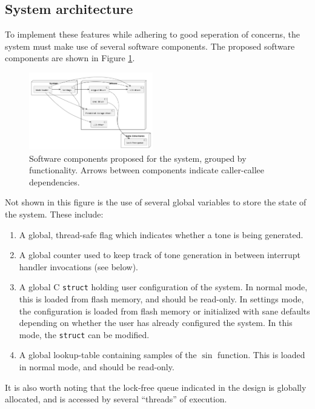 \documentclass[11pt,a4paper,twocolumn]{scrartcl}
\begin{document}
\subsection{System architecture} \label{system-arch}

To implement these features while adhering to good seperation of concerns, the system must make use of several software components.
The proposed software components are shown in Figure \ref{fig:software_components}.

\begin{figure}
   \centering
   \includegraphics[width=0.48\textwidth]{software_components}
   \caption{Software components proposed for the system, grouped by functionality. Arrows between components indicate caller-callee dependencies.}
   \label{fig:software_components}
\end{figure}

Not shown in this figure is the use of several global variables to store the state of the system. These include:

\begin{enumerate}
   \item A global, thread-safe flag which indicates whether a tone is being generated.
   \item A global counter used to keep track of tone generation in between interrupt handler invocations (see below).
   \item A global C \verb!struct! holding user configuration of the system. 
      In normal mode, this is loaded from flash memory, and should be read-only.
      In settings mode, the configuration is loaded from flash memory or initialized with sane defaults depending on whether the user has already 
      configured the system. In this mode, the \verb!struct! can be modified.
   \item A global lookup-table containing samples of the $\sin$ function. This is loaded in normal mode, and should be read-only.
\end{enumerate}

It is also worth noting that the lock-free queue indicated in the design is globally allocated, and is accessed by several ``threads'' of execution.
\end{document}
